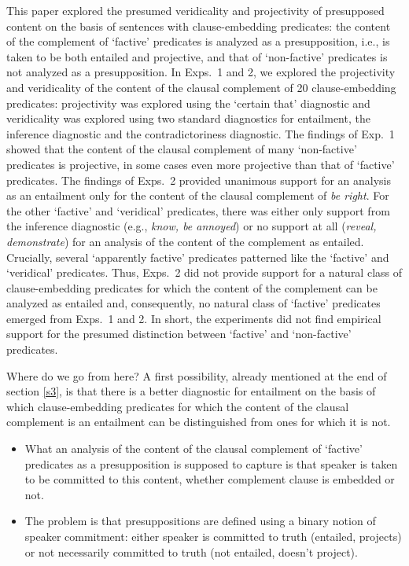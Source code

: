 \documentclass[11pt,fleqn]{article}
\newcommand{\6}{\mbox{$[\hspace*{-.6mm}[$}}
\newcommand{\9}{\mbox{$]\hspace*{-.6mm}]$}}
\begin{document}
{This paper explored the presumed veridicality and projectivity of presupposed content on the basis of sentences with clause-embedding predicates: the content of the complement of `factive' predicates is analyzed as a presupposition, i.e., is taken to be both entailed and projective, and that of `non-factive' predicates is not analyzed as a presupposition. In Exps.~1 and 2, we explored the projectivity and veridicality of the content of the clausal complement of 20 clause-embedding predicates: projectivity was explored using the `certain that' diagnostic and veridicality was explored using two standard diagnostics for entailment, the inference diagnostic and the contradictoriness diagnostic. The findings of Exp.~1 showed that the content of the clausal complement of many `non-factive' predicates is projective, in some cases even more projective than that of `factive' predicates. The findings of Exps.~2  provided unanimous support for an analysis as an entailment only for the content of the clausal complement of {\em be right}. For the other `factive' and `veridical' predicates, there was either only support from the inference diagnostic (e.g., {\em know, be annoyed}) or no support at all ({\em reveal, demonstrate}) for an analysis of the content of the complement as entailed. Crucially, several `apparently factive' predicates patterned like the `factive' and `veridical' predicates. Thus, Exps.~2 did not provide support for a natural class of clause-embedding predicates for which the content of the complement can be analyzed as entailed and, consequently, no natural class of `factive' predicates emerged from Exps.~1 and 2. In short, the experiments did not find empirical support for the presumed distinction between `factive' and `non-factive' predicates.

Where do we go from here? A first possibility, already mentioned at the end of section \ref{s3}, is that there is a better diagnostic for entailment on the basis of which clause-embedding predicates for which the content of the clausal complement is an entailment can be distinguished from ones for which it is not. 

\begin{itemize}

\item What an analysis of the content of the clausal complement of `factive' predicates as a presupposition is supposed to capture is that speaker is taken to be committed to this content, whether complement clause is embedded or not. 

\item The problem is that presuppositions are defined using a binary notion of speaker commitment: either speaker is committed to truth (entailed, projects) or not necessarily committed to truth (not entailed, doesn't project).


\end{itemize}}
\end{document}
